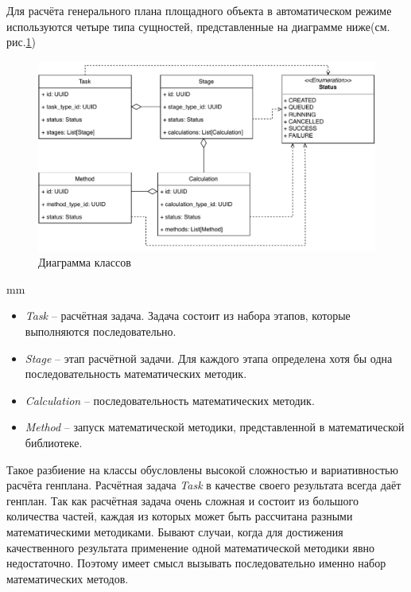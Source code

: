 Для расчёта генерального плана площадного объекта в автоматическом режиме используются четыре типа сущностей,
представленные на диаграмме ниже(см. рис.\ref{pic:architecture__orchestrator-classes})
\begin{figure}[H]
	\hspace*{-2.5 cm}\includegraphics[width=\textwidth]{architecture/pictures/orchestrator/classes}
	\caption{Диаграмма классов}
	\label{pic:architecture__orchestrator-classes}
\end{figure}
 mm

\begin{itemize}
	\item {
		\textit{Task} -- расчётная задача. Задача состоит из набора этапов, которые выполняются последовательно.
	}
	\item {
		\textit{Stage} -- этап расчётной задачи. Для каждого этапа определена хотя бы одна последовательность
		математических методик.
	}
	\item {
		\textit{Calculation} -- последовательность математических методик.
	}
	\item {
		\textit{Method} -- запуск математической методики, представленной в математической библиотеке.
	}
\end{itemize}

Такое разбиение на классы обусловлены высокой сложностью и вариативностью расчёта генплана.
Расчётная задача \textit{Task} в качестве своего результата всегда даёт генплан.
Так как расчётная задача очень сложная и состоит из большого количества частей,
каждая из которых может быть рассчитана разными математическими методиками.
Бывают случаи, когда для достижения качественного результата применение одной математической методики
явно недостаточно. Поэтому имеет смысл вызывать последовательно именно набор математических методов.

